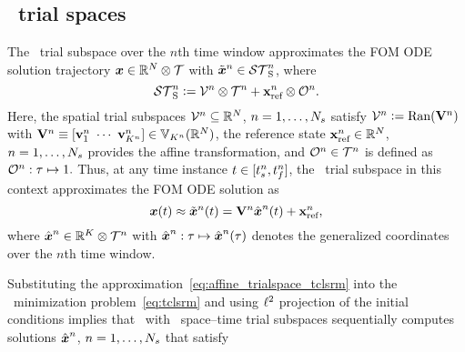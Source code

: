\subsection{\spatialAcronym\ trial spaces}
The \spatialAcronym\ trial subspace over the $n$th time window approximates
the FOM ODE solution trajectory ${\boldsymbol x}\in\mathbb{R}^{N}\otimes\mathcal{T}$
with $\tilde{\boldsymbol x}^{n} \in \mathcal{ ST }_{\text{S}}^{n}$, where
\begin{equation}\label{eq:sttrialspace}
 \mathcal{ ST }_{\text{S}}^{n} \vcentcolon= 
	\mathcal{V }^{n} \otimes \mathcal{T}^{n} +
	\mathbf{x}_\text{ref}^{n}\otimes\mathcal{O}^n.
\end{equation}
Here, the spatial trial subspaces $\mathcal{V }^{n}\subseteq\mathbb{R}^{N}$,
$n=1,\ldots,N_s$ satisfy 
$\mathcal{V }^{n}\vcentcolon=\mathrm{Ran}(\mathbf {V}^{n})$ with 
$\basismatArg{n}\equiv[\basisvecArg{n}_1\ \cdots\
\basisvecArg{n}_{\romdimArg{n}}]\in
\RRStar{\romdimArg{n}}{\fomdim}
$, the reference state $\mathbf{x}_\text{ref}^{n} \in \mathbb{R}^{N}$, $n=1,\ldots,N_s$ provides the affine transformation, 
and  
$\mathcal{O}^n\in\mathcal{T}^{n}$ is defined as
$\mathcal{O}^n:\tau\mapsto 1.$
Thus, at any time instance $t\in[t_s^{n},t_f^{n}]$, the
\spatialAcronym\ trial subspace in this context 
approximates the FOM ODE solution as
\begin{equation}\label{eq:affine_trialspace_tclsrm}
	{\boldsymbol x}(t)\approx \tilde{\boldsymbol x}^{n}(t) = \mathbf {V}^{n}
	\hat{ \boldsymbol x}^{n}(t) + \mathbf{x}_\text{ref}^{n},
\end{equation}
where $\hat{ \boldsymbol x}^{n} \in \mathbb{R}^{K} \otimes \mathcal{T}^{n}$ with
$\hat{ \boldsymbol x}^{n}: \tau\mapsto \hat{ \boldsymbol x}^{n}(\tau)
$ denotes the generalized coordinates over the $n$th time window. 

Substituting the approximation~\eqref{eq:affine_trialspace_tclsrm} into the
\methodAcronym\ minimization problem~\eqref{eq:tclsrm} and using $\ell^2$ projection of the 
initial conditions implies that 
\methodAcronym\ with \spatialAcronym\ space--time trial subspaces
sequentially computes solutions
$\hat{ \boldsymbol x}^{n}$, $n = 1,\ldots,N_s$ that satisfy

